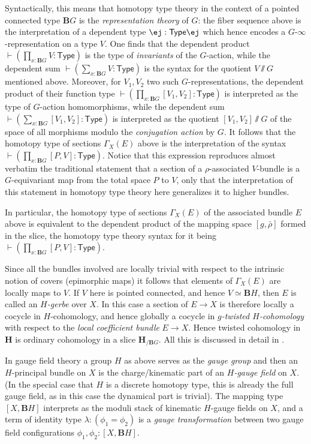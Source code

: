 \documentclass[copyright]{eptcs}
\makeatletter
\newcommand{\type}{\ensuremath{\mathsf{Type}}\xspace}
\def\jd#1{\@jd#1\ej}
\def\@jd#1|-#2\ej{\@@jd#1,,\;\vdash\;\left(#2\right)}
\def\@@jd#1,{\@ifmtarg{#1}{\let\next=\relax}{\left(#1\right)\let\next=\@@@jd}\next}
\def\@@@jd#1,{\@ifmtarg{#1}{\let\next=\relax}{,\,\left(#1\right)\let\next=\@@@jd}\next}
\makeatother
\begin{document}
Syntactically, this means that homotopy type theory in the context of a pointed connected type
$\mathbf{B}G$ is the \emph{representation theory} of $G$: the fiber sequence above
is the interpretation of a dependent type
$
  \jd{x : \mathbf{B}G |- V : \type}
$
which hence encodes a $G$-$\infty$-representation on a type $V$.
One finds that the dependent product
$
 \vdash( \prod_{x : \mathbf{B}G} V : \type)
$
is the type of \emph{invariants} of the $G$-action, while the dependent sum
$
  \vdash(\sum_{x : \mathbf{B}G} V : \type)
$
is the syntax for the quotient $V\sslash G$ mentioned above. Moreover, for $V_1, V_2$ two
such $G$-representations, the dependent product of their function type
$
  \vdash (\prod_{x : \mathbf{B}G} [V_1, V_2] : \type)
$
is interpreted as the type of $G$-action homomorphisms, while the dependent sum
$
  \vdash (\sum_{x : \mathbf{B}G} [V_1, V_2] : \type)
$
is interpreted
as
the quotient $[V_1, V_2]\sslash G$ of the space of all morphisms modulo
the \emph{conjugation action} by $G$. It follows that the homotopy type of sections
$\Gamma_X(E)$ above is the interpretation of the syntax
$\vdash (\prod_{x : \mathbf{B}G}  [P, V] : \type)$. Notice that this
expression reproduces almost verbatim the traditional statement that a section of a $\rho$-associated
$V$-bundle is a $G$-equivariant map from the total space $P$ to $V$, only that the
interpretation of this statement in homotopy type theory here generalizes it to higher bundles.

In particular, the
homotopy type of sections $\Gamma_X(E)$
of the associated bundle $E$ above is equivalent to the dependent product of the mapping
space $[g, \bar \rho]$ formed in the slice, the
homotopy type theory syntax for it being $\vdash( \prod_{x : \mathbf{B}G} [P, V] : \type)$.

Since all the bundles involved are locally trivial with respect to the intrinsic notion of
covers (epimorphic maps) it follows that
elements of $\Gamma_X(E)$ are locally maps to $V$. If $V$ here is pointed connected,
and hence $V \simeq \mathbf{B}H$, then $E$ is called an \emph{$H$-gerbe} over $X$.
In this case a section of $E \to X$ is therefore locally a cocycle in $H$-cohomology,
and hence globally a cocycle in \emph{$g$-twisted $H$-cohomology} with respect to the
\emph{local coefficient bundle} $E \to X$. Hence twisted cohomology in $\mathbf{H}$
is ordinary cohomology in a slice $\mathbf{H}_{/\mathbf{B}G}$. All this is discussed in
detail in \cite{NSS}.

In gauge field theory a group $H$ as above serves as the \emph{gauge group} and then
an $H$-principal bundle on $X$ is the charge/kinematic part of an \emph{$H$-gauge field} on $X$.
(In the special case that $H$ is a discrete homotopy type, this is already the full
gauge field, as in this case the dynamical part is trivial).
The mapping type $[X, \mathbf{B}H]$ interprets as the moduli stack of kinematic
$H$-gauge fields on $X$, and a term of identity type $\lambda :  (\phi_1 = \phi_2)$
is a \emph{gauge transformation} between two gauge field configurations $\phi_1, \phi_2: [X, \mathbf{B}H]$.
\end{document}
